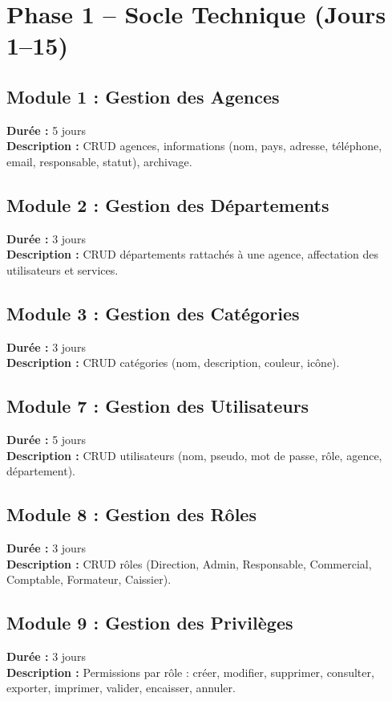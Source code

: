\documentclass[12pt,a4paper]{report}
\begin{document}
\section{Phase 1 -- Socle Technique (Jours 1--15)}
\label{sec:phase1}

\subsection*{Module 1 : Gestion des Agences}
\textbf{Durée :} 5 jours \\
\textbf{Description :} CRUD agences, informations (nom, pays, adresse, téléphone, email, responsable, statut), archivage.

\subsection*{Module 2 : Gestion des Départements}
\textbf{Durée :} 3 jours \\
\textbf{Description :} CRUD départements rattachés à une agence, affectation des utilisateurs et services.

\subsection*{Module 3 : Gestion des Catégories}
\textbf{Durée :} 3 jours \\
\textbf{Description :} CRUD catégories (nom, description, couleur, icône).

\subsection*{Module 7 : Gestion des Utilisateurs}
\textbf{Durée :} 5 jours \\
\textbf{Description :} CRUD utilisateurs (nom, pseudo, mot de passe, rôle, agence, département).

\subsection*{Module 8 : Gestion des Rôles}
\textbf{Durée :} 3 jours \\
\textbf{Description :} CRUD rôles (Direction, Admin, Responsable, Commercial, Comptable, Formateur, Caissier).

\subsection*{Module 9 : Gestion des Privilèges}
\textbf{Durée :} 3 jours \\
\textbf{Description :} Permissions par rôle : créer, modifier, supprimer, consulter, exporter, imprimer, valider, encaisser, annuler.
\end{document}

